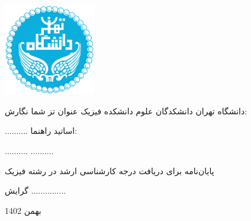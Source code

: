  \thispagestyle{empty}
	\begin{center}
 		\includegraphics[width=0.3\textwidth]{./Pictures/UTLogo}

		
		\vspace{0.5cm}
		{\Huge دانشگاه تهران}
		\linebreak
		\linebreak
		{\huge دانشکدگان علوم}
		\linebreak
		\linebreak
		{\LARGE دانشکده فیزیک}
		\linebreak
		\linebreak
		\linebreak	
			\vspace{0.5cm}
		{\LARGE
			عنوان تز شما}
		\linebreak
		\linebreak
		\linebreak
		\linebreak
		{\LARGE نگارش:}
					\vspace{0.5cm}
					
		{\LARGE ..........}
		\linebreak
		\linebreak
  		\linebreak
		{\LARGE اساتید راهنما:}
		
		{\LARGE 
            ..........
            }
            \linebreak
            {\LARGE 
            ..........
            }
		\linebreak
		\linebreak
		{\LARGE پایان‌نامه برای دریافت درجه کارشناسی ارشد در رشته فیزیک
			
			گرایش 
             ...............}
		\linebreak
		\linebreak
		\linebreak
		{\LARGE
            بهمن 1402}
	\end{center}